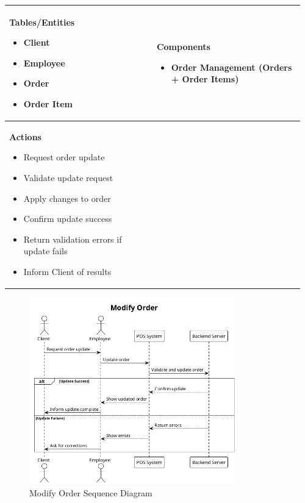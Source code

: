 \documentclass[]{VUMIFTemplateClass}
\newenvironment{mpitemlist}[1][\linewidth]{%
    \begin{minipage}[t]{#1}%
        \setlength{\leftmargini}{12pt}%
        \begin{itemize}%
            \setlength{\itemsep}{1pt}%
            \setlength{\parskip}{0pt}%
            \setlength{\parsep}{0pt}%
}{%
        \end{itemize}%
    \end{minipage}\newline
}
\begin{document}
\begin{center}
\setlength{\tabcolsep}{8pt}
\begin{tabular}{|p{0.48\linewidth}|p{0.48\linewidth}|}
\hline
\textbf{Tables/Entities} \newline
\begin{mpitemlist}
\item Client
\item Employee
\item Order
\item Order Item
\end{mpitemlist}
&
\textbf{Components} \newline
\begin{mpitemlist}
\item Order Management (Orders + Order Items)
\end{mpitemlist}
\\ \hline
\textbf{Actions} \newline
\begin{mpitemlist}
\item Request order update
\item Validate update request
\item Apply changes to order
\item Confirm update success
\item Return validation errors if update fails
\item Inform Client of results
\end{mpitemlist}
&

\\ \hline
\end{tabular}
\end{center}

\begin{figure}[H]
    \centering
    \includegraphics[width=0.8\textwidth]{images/diagrams/orders/order_modify_order_sequence.png}
    \caption{Modify Order Sequence Diagram}
    \label{fig:modify_order_sequence}
\end{figure}
\end{document}
